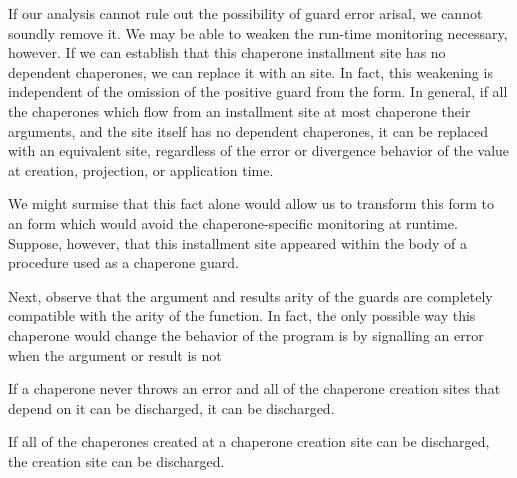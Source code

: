 \documentclass{sigplanconf}
\begin{document}
If our analysis cannot rule out the possibility of guard error arisal, we cannot soundly remove it.
We may be able to weaken the run-time monitoring necessary, however.
If we can establish that this chaperone installment site has no dependent chaperones, we can replace it with an  site.
In fact, this weakening is independent of the omission of the positive guard from the form.
In general, if all the chaperones which flow from an installment site at most chaperone their arguments, and the site itself has no dependent chaperones, it can be replaced with an equivalent  site, regardless of the error or divergence behavior of the value at creation, projection, or application time.




We might surmise that this fact alone would allow us to transform this  form to an  form which would avoid the chaperone-specific monitoring at runtime.
Suppose, however, that this installment site appeared within the body of a procedure used as a chaperone guard.

Next, observe that the argument and results arity of the guards are completely compatible with the arity of the function.
In fact, the only possible way this chaperone would change the behavior of the program is by signalling an error when the argument or result is not 

If a chaperone never throws an error and all of the chaperone creation sites that depend on it can be discharged, it can be discharged.

If all of the chaperones created at a chaperone creation site can be discharged, the creation site can be discharged.

\end{document}
